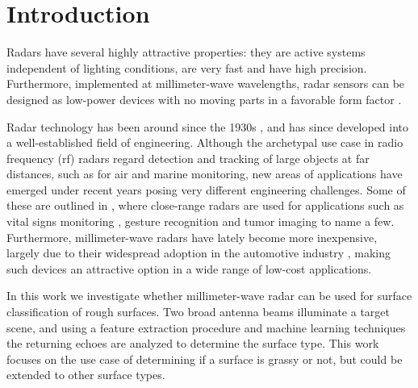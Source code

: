 \chapter{Introduction}

Radars have several highly attractive properties: they are active systems independent of lighting conditions, are very fast and have high precision. Furthermore, implemented at millimeter-wave wavelengths, radar sensors can be designed as low-power devices with no moving parts in a favorable form factor \citep{lien_gillian_karagozler_amihood_schwesig_olson_raja_poupyrev_2016}.

Radar technology has been around since the 1930s \citep{watson-watt_1945}, and has since developed into a well-established field of engineering. Although the archetypal use case in radio frequency (\gls{rf}) radars regard detection and tracking of large objects at far distances, such as for air and marine monitoring, new areas of applications have emerged under recent years posing very different engineering challenges. Some of these are outlined in \citep{amin_2017}, where close-range radars are used for applications such as vital signs monitoring \citep{kuo_lin_yu_lo_lyu_chou_chuang_2016}, gesture recognition \citep{lien_gillian_karagozler_amihood_schwesig_olson_raja_poupyrev_2016} and tumor imaging \citep{klemm_gibbins_leendertz_horseman_preece_benjamin_craddock_2011} to name a few. Furthermore, millimeter-wave radars have lately become more inexpensive, largely due to their widespread adoption in the automotive industry \citep{frenzel_2018}, making such devices an attractive option in a wide range of low-cost applications. %

In this work we investigate whether millimeter-wave radar can be used for surface classification of rough surfaces. Two broad antenna beams illuminate a target scene, and using a feature extraction procedure and machine learning techniques the returning echoes are analyzed to determine the surface type. This work focuses on the use case of determining if a surface is grassy or not, but could be extended to other surface types.  

